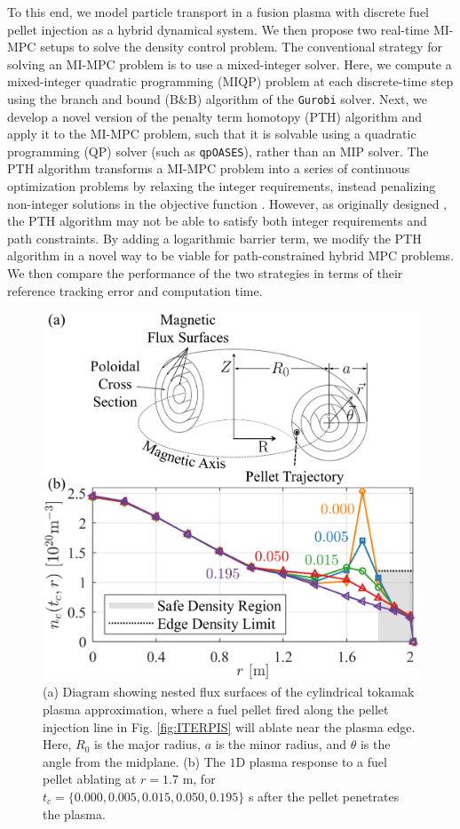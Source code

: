 \documentclass[journal,twoside,web]{ieeecolor}
\begin{document}
To this end, we model particle transport in a fusion plasma with discrete fuel pellet injection as a hybrid dynamical system. We then propose two real-time MI-MPC setups to solve the density control problem. The conventional strategy for solving an MI-MPC problem is to use a mixed-integer solver. Here, we compute a mixed-integer quadratic programming (MIQP) problem at each discrete-time step using the branch and bound (B\&B) algorithm of the \texttt{Gurobi} solver. Next, we develop a novel version of the penalty term homotopy (PTH) algorithm and apply it to the MI-MPC problem, such that it is solvable using a quadratic programming (QP) solver (such as \texttt{qpOASES}), rather than an MIP solver. The PTH algorithm \cite{Sager2006} transforms a MI-MPC problem into a series of continuous optimization problems by relaxing the integer requirements, instead penalizing non-integer solutions in the objective function \cite{Sager2006}. However, as originally designed \cite{Sager2006}, the PTH algorithm may not be able to satisfy both integer requirements and path constraints. By adding a logarithmic barrier term, we modify the PTH algorithm in a novel way to be viable for path-constrained hybrid MPC problems. We then compare the performance of the two strategies in terms of their reference tracking error and computation time. 


\begin{figure}[!t]
\centering 
\parbox{\columnwidth}{\includegraphics[width=\columnwidth]{orric2.eps}}
\caption{(a) Diagram showing nested flux surfaces of the cylindrical tokamak plasma approximation, where a fuel pellet fired along the pellet injection line in Fig. \ref{fig:ITERPIS} will ablate near the plasma edge. Here, $R_0$ is the major radius, $a$ is the minor radius, and $\theta$ is the angle from the midplane. (b) The $1\textrm{D}$ plasma response to a fuel pellet ablating at $r = 1.7$ m, for $t_c = \{0.000, 0.005, 0.015, 0.050, 0.195\}$ s after the pellet penetrates the plasma.}
\label{fig:FluxSurfToProfile}
\end{figure}
\end{document}
